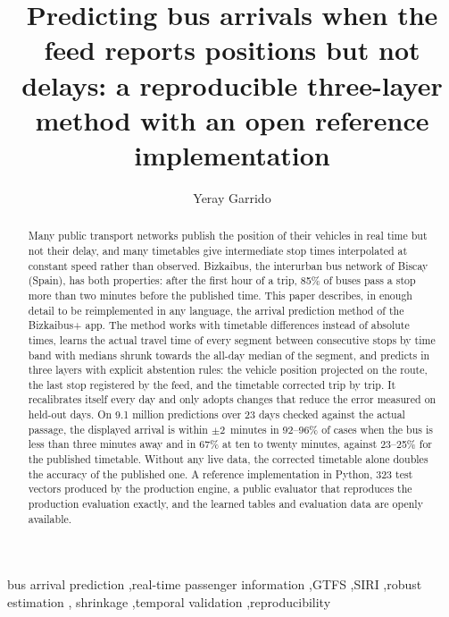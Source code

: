 \documentclass[preprint,11pt,nonatbib]{elsarticle}
\begin{document}
\begin{frontmatter}

\title{Predicting bus arrivals when the feed reports positions but not delays: a reproducible three-layer method
with an open reference implementation}

\author{Yeray Garrido}

\begin{abstract}
Many public transport networks publish the position of their vehicles in real time but not their delay, and many
timetables give intermediate stop times interpolated at constant speed rather than observed. Bizkaibus, the
interurban bus network of Biscay (Spain), has both properties: after the first hour of a trip, 85\% of buses pass a
stop more than two minutes before the published time. This paper describes, in enough detail to be reimplemented in
any language, the arrival prediction method of the Bizkaibus+ app. The method works with timetable differences
instead of absolute times, learns the actual travel time of every segment between consecutive stops by time band
with medians shrunk towards the all-day median of the segment, and predicts in three layers with explicit
abstention rules: the vehicle position projected on the route, the last stop registered by the feed, and the
timetable corrected trip by trip. It recalibrates itself every day and only adopts changes that reduce the error
measured on held-out days. On 9.1 million predictions over 23 days checked against the actual passage, the displayed
arrival is within $\pm2$~minutes in 92--96\% of cases when the bus is less than three minutes away and in 67\% at
ten to twenty minutes, against 23--25\% for the published timetable. Without any live data, the corrected timetable
alone doubles the accuracy of the published one. A reference implementation in Python, 323 test vectors produced by
the production engine, a public evaluator that reproduces the production evaluation exactly, and the learned tables
and evaluation data are openly available.
\end{abstract}

\begin{keyword}
bus arrival prediction \sep real-time passenger information \sep GTFS \sep SIRI \sep robust estimation \sep
shrinkage \sep temporal validation \sep reproducibility
\end{keyword}

\end{frontmatter}
\end{document}
